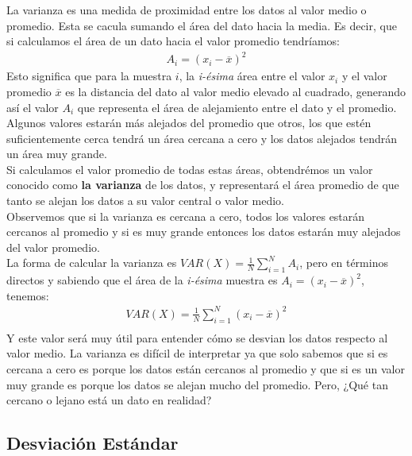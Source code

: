 \documentclass{article}
\begin{document}
La varianza es una medida de proximidad entre los datos al valor medio o promedio. Esta se cacula sumando el área del dato hacia la media. Es decir, que si calculamos el área de un dato hacia el valor promedio tendríamos:
\begin{equation}
    \begin{aligned}
        A_i = (x_i - \overline{x})^2
    \end{aligned}
\end{equation}
Esto significa que para la muestra $i$, la \textit{i-ésima} área entre el valor $x_i$ y el valor promedio $\overline{x}$ es la distancia del dato al valor medio elevado al cuadrado, generando así el valor $A_i$ que representa el área de alejamiento entre el dato y el promedio.
\\[12pt]
Algunos valores estarán más alejados del promedio que otros, los que estén suficientemente cerca tendrá un área cercana a cero y los datos alejados tendrán un área muy grande.
\\[12pt]
Si calculamos el valor promedio de todas estas áreas, obtendrémos un valor conocido como \textbf{la varianza} de los datos, y representará el área promedio de que tanto se alejan los datos a su valor central o valor medio.
\\[12pt]
Observemos que si la varianza es cercana a cero, todos los valores estarán cercanos al promedio y si es muy grande entonces los datos estarán muy alejados del valor promedio.
\\[12pt]
La forma de calcular la varianza es $VAR(X) = \frac{1}{N} \sum_{i=1}^{N} A_i$, pero en términos directos y sabiendo que el área de la \textit{i-ésima} muestra es $A_i = (x_i - \overline{x})^2$, tenemos:
\begin{equation}
    \begin{aligned}
        VAR(X) = \frac{1}{N} \sum_{i=1}^{N} (x_i - \overline{x})^2 \\
    \end{aligned}
\end{equation}
Y este valor será muy útil para entender cómo se desvian los datos respecto al valor medio. La varianza es difícil de interpretar ya que solo sabemos que si es cercana a cero es porque los datos están cercanos al promedio y que si es un valor muy grande es porque los datos se alejan mucho del promedio. Pero, ¿Qué tan cercano o lejano está un dato en realidad?

\subsection{Desviación Estándar}
\end{document}
